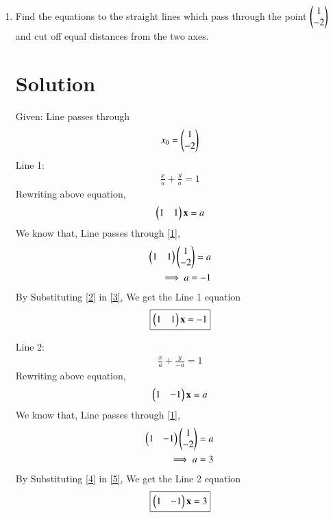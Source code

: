 \documentclass[journal,12pt,twocolumn]{IEEEtran}
\renewcommand\thesection{\arabic{section}}
\begin{document}
\begin{enumerate}[label=\thesection.\arabic*.,ref=\thesection.\theenumi]

\item Find the equations to the straight lines which pass through the point $\begin{pmatrix}1\\-2\end{pmatrix}$ and cut off equal distances from the two axes.

\section{Solution}
Given: Line passes through
\begin{align}
x_0=\begin{pmatrix}1\\-2\end{pmatrix}
\label{1}
\end{align}
Line 1: 
\begin{align}
\frac{x}{a}+\frac{y}{a}=1
\end{align}
Rewriting above equation,
\begin{align}
\begin{pmatrix}1&1\end{pmatrix}\mathbf{x}=a
\label{3}
\end{align}
We know that, Line passes through \eqref{1},
\begin{align}
\begin{pmatrix}1&1\end{pmatrix}\begin{pmatrix}1\\-2\end{pmatrix}=a\\
\implies a = -1\label{2}
\end{align}
By Substituting \eqref{2} in \eqref{3}, We get the Line 1 equation
\begin{align}
\boxed{\begin{pmatrix}1&1\end{pmatrix}\mathbf{x}=-1}
\end{align}


Line 2:
\begin{align}
\frac{x}{a}+\frac{y}{-a}=1
\end{align}
Rewriting above equation,
\begin{align}
\begin{pmatrix}1&-1\end{pmatrix}\mathbf{x}=a
\label{5}
\end{align}
We know that, Line passes through \eqref{1},
\begin{align}
\begin{pmatrix}1&-1\end{pmatrix}\begin{pmatrix}1\\-2\end{pmatrix}=a\\
\implies a = 3\label{4}
\end{align}
By Substituting \eqref{4} in \eqref{5}, We get the Line 2 equation
\begin{align}
\boxed{\begin{pmatrix}1&-1\end{pmatrix}\mathbf{x}=3}
\end{align}



\end{enumerate}
\end{document}
